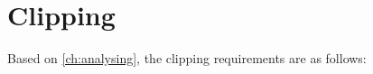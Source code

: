 \newcommand{\reqclipping}{The delay unit must delay the input signal, in time defined by external unit.}

\section{Clipping}
Based on \autoref{ch:analysing}, the clipping requirements are as follows:

\begin{requirement}\label{req:hard_clipping}
\end{requirement}

\begin{requirement}\label{req:soft_clipping}
\end{requirement}

